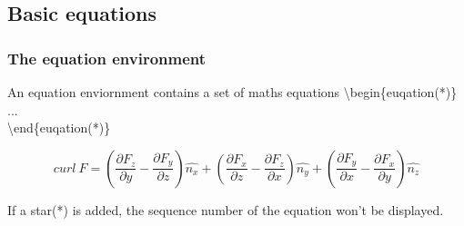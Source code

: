 \documentclass{beamer}
\begin{document}
\subsection{Basic equations}

\begin{frame}
	\frametitle{The equation environment}
	\begin{definition}
		An {\color{blue}equation} enviornment contains a set of maths equations
		{\color{red}\textbackslash begin\{euqation(*)\}}\\
		\quad ...\\
		{\color{red}\textbackslash end\{euqation(*)\}}\\
	\end{definition}
	\begin{example}
		\begin{equation}
		curl\ F=\left(\frac{\partial F_z}{\partial y}-\frac{\partial F_y}{\partial z}\right)\hat{n_x}+\left(\frac{\partial F_x}{\partial z}-\frac{\partial F_z}{\partial x}\right)\hat{n_y}+\left(\frac{\partial F_y}{\partial x}-\frac{\partial F_x}{\partial y}\right)\hat{n_z}
		\end{equation}
	\end{example}
	If a star({\color{blue}*}) is added, the sequence number of the equation won't be displayed.
\end{frame}
\end{document}
